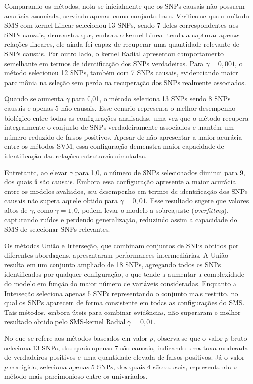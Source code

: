 \documentclass[
    12pt,
    a4paper,
    oneside,
    english,
    french,
    spanish,
    brazil
    ]{abntex2}
\begin{document}
Comparando os métodos, nota-se inicialmente que os SNPs causais não possuem acurácia associada, servindo apenas como conjunto base. Verifica-se que o método SMS com kernel Linear selecionou 13 SNPs, sendo 7 deles correspondentes aos SNPs causais, demonstra que, embora o kernel Linear tenda a capturar apenas relações lineares, ele ainda foi capaz de recuperar uma quantidade relevante de SNPs causais. Por outro lado, o kernel Radial apresentou comportamento semelhante em termos de identificação dos SNPs verdadeiros. Para $\gamma = 0{,}001$, o método selecionou 12 SNPs, também com 7 SNPs causais, evidenciando maior parcimônia na seleção sem perda na recuperação dos SNPs realmente associados.

Quando se aumenta $\gamma$ para 0,01, o método seleciona 13 SNPs sendo 8 SNPs causais e apenas 5 não causais. Esse cenário representa o melhor desempenho biológico entre todas as configurações analisadas, uma vez que o método recupera integralmente o conjunto de SNPs verdadeiramente associados e mantém um número reduzido de falsos positivos. Apesar de não apresentar a maior acurácia entre os métodos SVM, essa configuração demonstra maior capacidade de identificação das relações estruturais simuladas.

Entretanto, ao elevar $\gamma$ para 1,0, o número de SNPs selecionados diminui para 9, dos quais 6 são causais. Embora essa configuração apresente a maior acurácia entre os modelos avaliados, seu desempenho em termos de identificação dos SNPs causais não supera aquele obtido para $\gamma = 0{,}01$. Esse resultado sugere que valores altos de $\gamma$, como $\gamma = 1{,}0$, podem levar o modelo a sobreajuste (\textit{overfitting}), capturando ruídos e perdendo generalização, reduzindo assim a capacidade do SMS de selecionar SNPs relevantes.

Os métodos União e Interseção, que combinam conjuntos de SNPs obtidos por diferentes abordagens, apresentaram performances intermediárias. A União resulta em um conjunto ampliado de 18 SNPs, agregando todos os SNPs identificados por qualquer configuração, o que tende a aumentar a complexidade do modelo em função do maior número de variáveis consideradas. Enquanto a Interseção seleciona apenas 5 SNPs representando o conjunto mais restrito, no qual os SNPs aparecem de forma consistente em todas as configurações do SMS. Tais métodos, embora úteis para combinar evidências, não superaram o melhor resultado obtido pelo SMS-kernel Radial $\gamma = 0{,}01$.

No que se refere aos métodos baseados em valor-$p$, observa-se que o valor-$p$ bruto seleciona 13 SNPs, dos quais apenas 7 são causais, indicando uma taxa moderada de verdadeiros positivos e uma quantidade elevada de falsos positivos. Já o valor-$p$ corrigido, seleciona apenas 5 SNPs, dos quais 4 são causais, representando o método mais parcimonioso entre os univariados.
\end{document}
